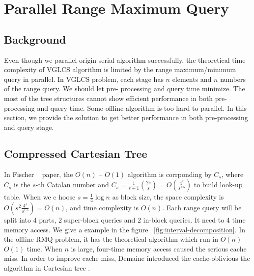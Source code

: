 \section{Parallel Range Maximum Query}
\label{sec:parallelRMQ}

\subsection{Background}

Even though we parallel origin serial algorithm successfully, the
theoretical time complexity of VGLCS algorithm is limited by the range
maximum/minimum query in parallel.  In VGLCS problem, each stage has
$n$ elements and $n$ numbers of the range query.  We should let pre-
processing and query time minimize.  The most of the tree structures
cannot show efficient performance in both pre-processing and query
time.  Some offline algorithm is too hard to parallel.  In this
section, we provide the solution to get better performance in both
pre-processing and query stage.

\iffalse
縱使我們已能很好地平行化原本的序列算法，在理論複雜度上受限於平行下的區間極值查詢 (Range Minimum/Maximum Query, RMQ)。
在這個應用中，每一階段有 $n$ 個元素和 $n$ 個區間詢問。
這樣的條件下，大部分樹狀結構難以在前處理過程和每次詢問皆達到最好效能。
對於 $O(n)$ -- $O(1)$ 操作的離線區間詢問無法提供平行。
再接續的小節中，我們將提出在兼顧建表、插入和查找的數據結構與算法。
\fi

\subsection{Compressed Cartesian Tree}

In Fischer ~\cite{Fischer2006TheoreticalAP} paper, the $O(n)$ --
$O(1)$ algorithm is corrponding by $C_s$, where $C_s$ is the $s$-th
Catalan number  and $C_s = \frac{1}{s+1}\binom{2s}{s} =
O(\frac{4^s}{s^{1.5}})$ to build look-up table.  When we c hoose $s =
\frac{1}{4} \log n$ as block size, the space complexity is $O(s^2
\frac{4^s}{s^{1.5}}) = O(n)$, and time complexity is $O(n)$.  Each
range query will be split into 4 parts, 2 super-block queries and 2
in-block queries.  It need to 4 time memory access.  We give a example
in the figure ~\ref{fig:interval-decomposition}.  In the offline RMQ
problem, it has the theoretical algorithm which run in $O(n)$ --
$O(1)$ time.  When $n$ is large, four-time memory access caused the
serious cache miss. In order to improve cache miss, Demaine introduced
the cache-oblivious the algorithm \cite{Demaine2009OnCT} in Cartesian
tree \cite{Vuillemin1980AUL}.

